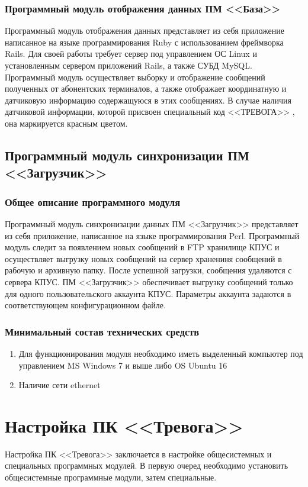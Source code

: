 ﻿\documentclass[12pt]{article}[a4paper,14pt,russian]
\begin{document}
	\subsubsection{Программный модуль отображения данных ПМ <<База>>}

	Программный модуль отображения данных представляет из себя приложение написанное
	на языке программирования Ruby с использованием фреймворка Rails. Для своей работы требует сервер под управлением ОС Linux и установленным сервером приложений Rails, а также СУБД MySQL. Программный модуль осуществляет выборку и отображение сообщений полученных от абонентских терминалов, а также отображает координатную и датчиковую информацию содержащуюся в этих сообщениях. В случае наличия датчиковой информации, которой присвоен специальный код <<ТРЕВОГА>> , она маркируется красным цветом.
	

	
	\subsection{Программный модуль синхронизации ПМ <<Загрузчик>>}
	\subsubsection{Общее описание программного модуля}
	Программный модуль синхронизации данных ПМ <<Загрузчик>>  представляет из себя приложение, написанное на
	языке программирования Perl. Программный модуль следит за появлением новых сообщений в FTP хранилище КПУС и осуществляет выгрузку новых сообщений на сервер хранениня сообщений в рабочую и архивную папку. После успешной загрузки, сообщения удаляются с сервера КПУС. ПМ <<Загрузчик>> обеспечивает выгрузку сообщений только для одного пользовательского аккаунта КПУС. Параметры аккаунта задаются в соответствующем конфигурационном файле.
	
	\subsubsection{Минимальный состав технических средств}

	\begin{enumerate}
	\item	Для функционирования модуля необходимо иметь выделенный компьютер под управлением
	MS Windows 7 и выше либо OS Ubuntu 16
	\item Наличие сети ethernet
	\end{enumerate}
	\section {Настройка ПК <<Тревога>>}
	Настройка ПК <<Тревога>> заключается в настройке общесистемных и специальных программных модулей. В первую очеред необходимо установить общесистемные программные модули, затем специальные. 
\end{document}
